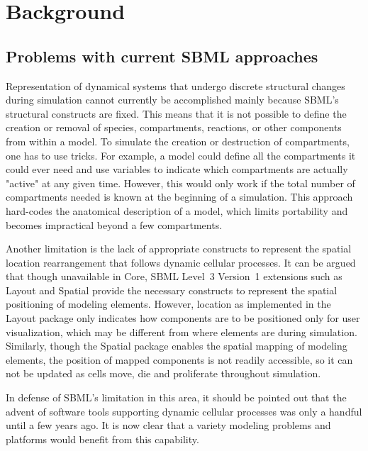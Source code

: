
\section{ Background }
\label{sec:background}

\subsection{ Problems with current SBML approaches }
\label{subsec:problems}

Representation of dynamical systems that undergo discrete structural changes during simulation cannot currently be accomplished mainly because SBML's structural constructs are fixed. This means that it is not possible to define the creation or removal of species, compartments, reactions, or other components from within a model. To simulate the creation or destruction of compartments, one has to use tricks. For example, a model could define all the compartments it could ever need and use variables to indicate which compartments are actually "active" at any given time. However, this would only work if the total number of compartments needed is known at the beginning of a simulation. This approach hard-codes the anatomical description of a model, which limits portability and becomes impractical beyond a few compartments. 

Another limitation is the lack of appropriate constructs to represent the spatial location rearrangement that follows dynamic cellular processes. It can be argued that though unavailable in Core, SBML Level~3 Version~1 extensions such as Layout and Spatial provide the necessary constructs to represent the spatial positioning of modeling elements. However, location as implemented in the Layout package only indicates how components are to be positioned only for user visualization, which may be different from where elements are during simulation. Similarly, though the Spatial package enables the spatial mapping of modeling elements, the position of mapped components is not readily accessible, so it can not be updated as cells move, die and proliferate throughout simulation.

In defense of SBML's limitation in this area, it should be pointed out that the advent of software tools supporting dynamic cellular processes was only a handful until a few years ago. It is now clear that a variety modeling problems and platforms would benefit from this capability. 

